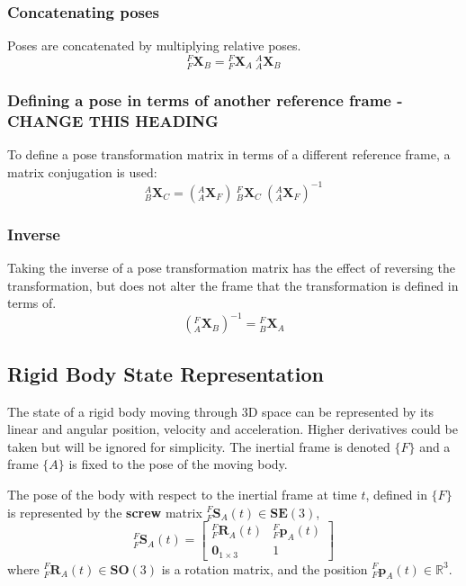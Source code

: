 		\subsubsection{Concatenating poses}
		Poses are concatenated by multiplying relative poses.
		\begin{equation}
			{^{F}_{F}\mathbf{X}^{}_{B}} = {^{F}_{F}\mathbf{X}^{}_{A}}\:{^{A}_{A}\mathbf{X}^{}_{B}}
		\end{equation}
		
		\subsubsection{Defining a pose in terms of another reference frame - CHANGE THIS HEADING}
		To define a pose transformation matrix in terms of a different reference frame, a matrix conjugation is used:
		\begin{equation}
			{^{A}_{B}\mathbf{X}^{}_{C}} = ({^{A}_{A}\mathbf{X}^{}_{F}})\:{^{F}_{B}\mathbf{X}^{}_{C}}\:({^{A}_{A}\mathbf{X}^{}_{F}})^{-1}
		\end{equation}

		\subsubsection{Inverse}
		Taking the inverse of a pose transformation matrix has the effect of reversing the transformation, but does not alter the frame that the transformation is defined in terms of.
		\begin{equation}
			({^{F}_{A}\mathbf{X}^{}_{B}})^{-1} = {^{F}_{B}\mathbf{X}^{}_{A}}
		\end{equation}
	
	\subsection{Rigid Body State Representation} \label{state rep}
		The state of a rigid body moving through 3D space can be represented by its linear and angular position, velocity and acceleration. Higher derivatives could be taken but will be ignored for simplicity.
		The inertial frame is denoted $\{F\}$ and a frame $\{A\}$ is fixed to the pose of the moving body.
		
		The pose of the body with respect to the inertial frame at time $t$, defined in $\{F\}$ is represented by the \textbf{screw} matrix ${^{F}_{F}\mathbf{S}^{}_{A}(t)} \in \mathbf{SE}(3)$,
		\begin{equation}
				{^{F}_{F}\mathbf{S}^{}_{A}(t)} = 
				\begin{bmatrix}
						  ^{F}_{F}\mathbf{R}^{}_{A}(t) 	& 	^{F}_{F}\mathbf{p}^{}_{A}(t)\\
						  \textbf{0}_{1 \times 3} & 1						  
				\end{bmatrix}
		\end{equation}
		where $^{F}_{F}\mathbf{R}^{}_{A}(t) \in \mathbf{SO}(3)$ is a rotation matrix, and the position $^{F}_{F}\mathbf{p}^{}_{A}(t) \in \mathbb{R}^3$.
		
